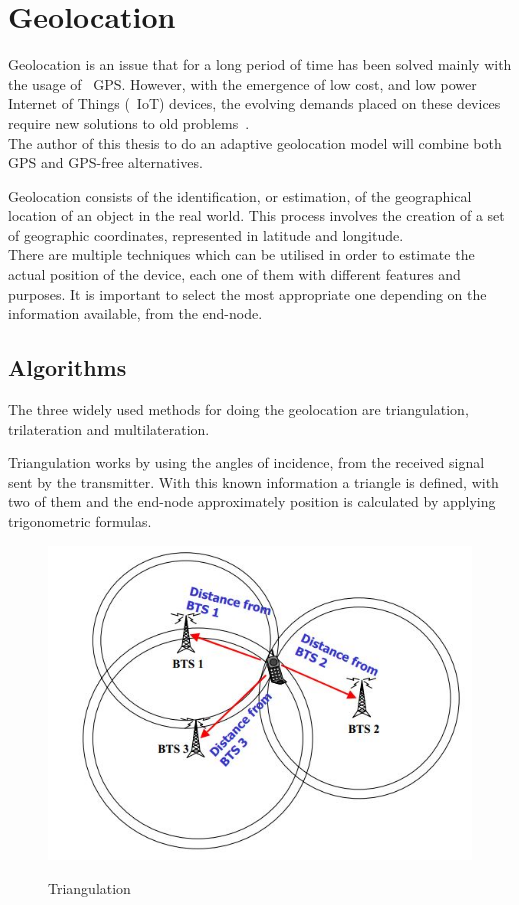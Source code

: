 
\newpage

\section{Geolocation} %
\label{sec:Geolocation}

Geolocation is an issue that for a long period of time has been solved mainly with the usage of ~\gls{GPS}. However, with the emergence of low cost, and low power Internet of Things (~\gls{IoT}) devices, the evolving demands placed on these devices require new solutions to old problems~\cite{Danebjer2018}.\\
The author of this thesis  to do an adaptive geolocation model will combine both GPS and GPS-free alternatives.

Geolocation consists of the identification, or estimation, of the geographical location of an object in the real world. This process involves the creation of a set of geographic coordinates, represented in latitude and longitude.\\There are multiple techniques which can be utilised in order to estimate the actual position of the device, each one of them with  different features and purposes. It is important to select the most appropriate one depending on the information available, from the end-node.

\subsection{Algorithms}
\label{sec:Geolocation_Algorithm}

The three widely used methods  for doing the geolocation are triangulation, trilateration and multilateration. 

Triangulation works by using the  angles of incidence, from the received signal sent by  the transmitter. With this known information a triangle is defined, with two of them and the end-node approximately position is calculated by applying trigonometric formulas.\\
\begin{figure}[htbp]
  \centering
  
    {\includegraphics[width=0.5\linewidth]{Chapters/Figures/triangulation.JPG}}%
 
  \caption{Triangulation~\cite{triangulation}}
  \label{fig:Triangulation}
\end{figure}

